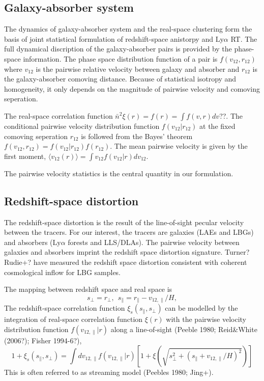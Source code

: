 \documentclass[useAMS,usenatbib,twocolumn]{mn2e}
\newcommand{\LyA}{\mbox{Ly}\alpha}
\begin{document}
\subsection{Galaxy-absorber system}
The dynamics of galaxy-absorber system and the real-space clustering form the
basis of joint statistical formulation of redshift-space anistorpy and 
$\LyA$ RT. The full dynamical discription of the galaxy-absorber pairs
is provided by the phase-space information. The phase space distribution 
function of a pair is $f(v_{12},r_{12})$ where $v_{12}$ is
the pairwise relative velocity between galaxy and absorber and $r_{12}$ is
the galaxy-absorber comoving distance. Because of statistical isotropy and
homogeneity, it only depends on the magnitude of pairwise velocity and
comoving seperation. 

The real-space correlation function $\bar{n}^2\xi(r)=f(r)=\int f(v,r)dv$??.
The conditional pairwise velocity distribution function $f(v_{12}|r_{12})$
at the fixed comoving seperation $r_{12}$ is followed from the Bayes' theorem
$f(v_{12},r_{12})=f(v_{12}|r_{12})f(r_{12})$. The mean pairwise velocity is
given by the first moment, $\langle v_{12}(r)\rangle=\int v_{12}f(v_{12}|r)
dv_{12}$.

The pairwise velocity statistics is the central quantity in our formulation.

\subsection{Redshift-space distortion}
The redshift-space distortion is the result of the line-of-sight pecular 
velocity between the tracers. For our interest, the tracers are galaxies 
(LAEs and LBGs) and absorbers ($\LyA$ forests and LLS/DLAs). 
The pairwise velocity between galaxies and absorbers imprint the redshift space
distortion signature. Turner? Rudie+? have measured the redshift space 
distortion consistent with coherent cosmological inflow for LBG samples. 

The mapping between redshift space and real space is
\begin{equation}
s_\perp=r_\perp,~~s_\parallel=r_\parallel-v_{12,\parallel}/H,
\end{equation}
The redshift-space correlation function $\xi_s(s_\parallel,s_\perp)$ can be 
modelled by the integration of real-space correlation function $\xi(r)$
with the pairwise velocity distribution function $f(v_{12,\parallel}|r)$ along a 
line-of-sight (Peeble 1980; Reid\&White (2006?); Fisher 1994-6?),
\begin{equation}
1+\xi_s(s_\parallel,s_\perp)=\int dv_{12,\parallel}f(v_{12,\parallel}|r)
\left[1+\xi(\sqrt{s_\perp^2+(s_\parallel+v_{12,\parallel}/H)^2})\right]
\end{equation}
This is often referred to as streaming model (Peebles 1980; Jing+).
\end{document}
